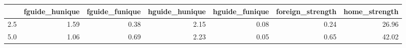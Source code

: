 \begin{tabular}{lrrrrrr}
\toprule
 & fguide_hunique & fguide_funique & hguide_hunique & hguide_funique & foreign_strength & home_strength \\
\midrule
2.5 & 1.59 & 0.38 & 2.15 & 0.08 & 0.24 & 26.96 \\
5.0 & 1.06 & 0.69 & 2.23 & 0.05 & 0.65 & 42.02 \\
\bottomrule
\end{tabular}
